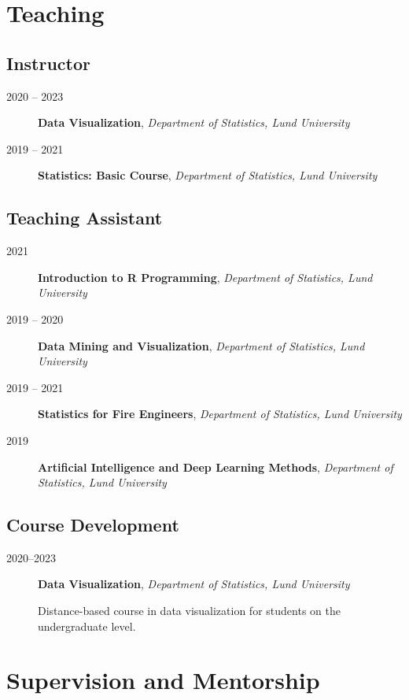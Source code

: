 \documentclass[english,a4paper]{article}
\renewcommand*{%
  \mkbibnamegiven
}[1]{\ifitemannotation{highlight}{\textbf{#1}}{#1}}
\renewcommand*{%
  \mkbibnamefamily
}[1]{\ifitemannotation{highlight}{\textbf{#1}}{#1}}
\begin{document}
\section{Teaching}

\subsection{Instructor}

\begin{description}
  \item[2020 -- 2023]{\textbf{Data Visualization}, \emph{Department of Statistics, Lund University}}
  \item[2019 -- 2021]{\textbf{Statistics: Basic Course}, \emph{Department of Statistics, Lund University}}
\end{description}

\subsection{Teaching Assistant}

\begin{description}
  \item[2021]{\textbf{Introduction to R Programming}, \emph{Department of Statistics, Lund University}}
  \item[2019 -- 2020]{\textbf{Data Mining and Visualization}, \emph{Department of Statistics, Lund University}}
  \item[2019 -- 2021]{\textbf{Statistics for Fire Engineers}, \emph{Department of Statistics, Lund University}}
  \item[2019]{\textbf{Artificial Intelligence and Deep Learning Methods}, \emph{Department of Statistics, Lund University}}
\end{description}

\subsection{Course Development}

\begin{description}
  \item[2020--2023]{
        \textbf{Data Visualization}, \emph{Department of Statistics, Lund
          University}

        Distance-based course in data visualization for students on
        the undergraduate level.
        }
\end{description}

\section{Supervision and Mentorship}
\end{document}
